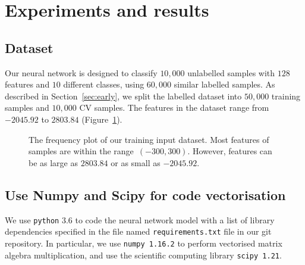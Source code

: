 \section{Experiments and results}\label{chapter4}

\subsection{Dataset}

Our neural network is designed to classify $10,000$ unlabelled samples with $128$ features and $10$ different classes, using $60,000$ similar labelled samples. As described in Section~\ref{sec:early}, we split the labelled dataset into $50,000$ training samples and $10,000$ CV samples. The features in the dataset range from $-2045.92$ to $2803.84$ (Figure~\ref{fig:freq-hist}).
\begin{figure}
    \caption{The frequency plot of our training input dataset. Most features of samples are within the range~$(-300,300)$. However, features can be as large as $2803.84$ or as small as $-2045.92$.}
    \label{fig:freq-hist}
\end{figure}

\subsection{Use Numpy and Scipy for code vectorisation}
We use \texttt{python} 3.6 to code the neural network model with a list of library dependencies specified in the file named \texttt{requirements.txt} file in our git repository. 
In particular, we use \texttt{numpy 1.16.2}  to perform vectorised matrix algebra multiplication, and use the scientific computing library \texttt{scipy 1.21}.

